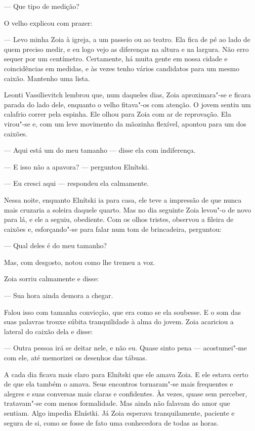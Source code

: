 --- Que tipo de medição?

O velho explicou com prazer:

--- Levo minha Zoia à igreja, a um passeio ou ao teatro. Ela fica de pé
ao lado de quem preciso medir, e eu logo vejo as diferenças na altura e
na largura. Não erro sequer por um centímetro. Certamente, há muita
gente em nossa cidade e coincidências em medidas, e às vezes tenho
vários candidatos para um mesmo caixão. Mantenho uma lista.

Leonti Vassílievitch lembrou que, num daqueles dias, Zoia aproximara"-se
e ficara parada do lado dele, enquanto o velho fitava"-os com atenção. O
jovem sentiu um calafrio correr pela espinha. Ele olhou para Zoia com ar
de reprovação. Ela virou"-se e, com um leve movimento da mãozinha
flexível, apontou para um dos caixões.

--- Aqui está um do meu tamanho --- disse ela com indiferença.

--- E isso não a apavora? --- perguntou Elnítski.

--- Eu cresci aqui --- respondeu ela calmamente.

Nessa noite, enquanto Elnítski ia para casa, ele teve a impressão de que
nunca mais cruzaria a soleira daquele quarto. Mas no dia seguinte Zoia
levou"-o de novo para lá, e ele a seguiu, obediente. Com os olhos
tristes, observou a fileira de caixões e, esforçando"-se para falar
num tom de brincadeira, perguntou:

--- Qual deles é do meu tamanho?

Mas, com desgosto, notou como lhe tremeu a voz.

Zoia sorriu calmamente e disse:

--- Sua hora ainda demora a chegar.

Falou isso com tamanha convicção, que era como se ela soubesse. E o som
das suas palavras trouxe súbita tranquilidade à alma do jovem. Zoia
acariciou a lateral do caixão dela e disse:

--- Outra pessoa irá se deitar nele, e não eu. Quase sinto pena ---
acostumei"-me com ele, até memorizei os desenhos das tábuas.

A cada dia ficava mais claro para Elnítski que ele amava Zoia. E ele
estava certo de que ela também o amava. Seus encontros tornaram"-se mais
frequentes e alegres e suas conversas mais claras e confidentes. Às
vezes, quase sem perceber, tratavam"-se com menos formalidade. Mas ainda
não falavam do amor que sentiam. Algo impedia Elnístki. Já Zoia esperava
tranquilamente, paciente e segura de si, como se fosse de fato uma
conhecedora de todas as horas.

